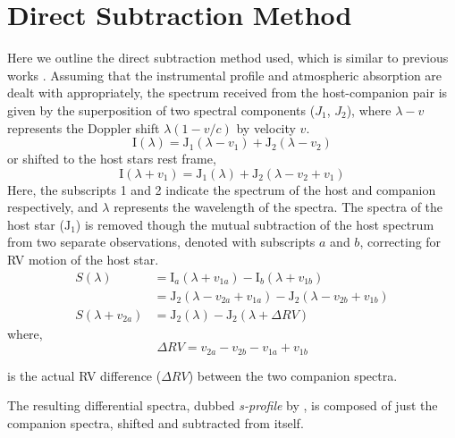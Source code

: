 \section{Direct Subtraction Method}
\label{appendix:A1}
Here we outline the direct subtraction method used, which is similar to previous works \citep{ferluga_separating_1997,kostogryz_spectral_2013}. Assuming that the instrumental profile and atmospheric absorption are dealt with appropriately, the spectrum received from the host-companion pair is given by the superposition of two spectral components (\(J_{1} \), \(J_{2} \)), where \(\lambda-v\) represents the Doppler shift \(\lambda(1-v/c)\) by velocity \(v\).
\begin{equation}
\textrm{I}(\lambda) = \textrm{J}_{1}(\lambda - v_{1}) + \textrm{J}_{2}(\lambda - v_{2})
\end{equation}
or shifted to the host stars rest frame,
\begin{equation}
\textrm{I}(\lambda + v_{1}) = \textrm{J}_{1}(\lambda) + \textrm{J}_{2}(\lambda - v_{2} + v_{1})
\end{equation}
Here, the subscripts 1 and 2 indicate the spectrum of the host and companion respectively, and \(\lambda \) represents the wavelength of the spectra.
The spectra of the host star (\(\textrm{J}_{1} \)) is removed though the mutual subtraction of the host spectrum from two separate observations, denoted with subscripts \(a\) and \(b\), correcting for RV motion of the host star.
\begin{align}
	S(\lambda) &= \textrm{I}_{a}(\lambda + v_{1a}) - \textrm{I}_{b}(\lambda + v_{1b}) \nonumber \\
	&= \textrm{J}_{2}(\lambda - v_{2a} + v_{1a}) - \textrm{J}_{2}(\lambda - v_{2b}  + v_{1b}) \nonumber \\
	S(\lambda + v_{2a}) &= \textrm{J}_{2}(\lambda) - \textrm{J}_{2}(\lambda + \Delta RV )  \label{eqn:sprofile}
\end{align}
where,
\begin{equation}
\Delta RV = v_{2a} - v_{2b} - v_{1a} + v_{1b} \label{eqn:k}
\end{equation}

is the actual RV difference (\(\Delta RV \)) between the two companion spectra.

The resulting differential spectra, dubbed \emph{s-profile} by \citet{ferluga_separating_1997}, is composed of just the companion spectra, shifted and subtracted from itself.

